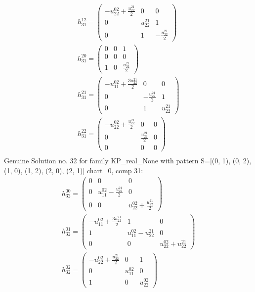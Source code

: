 \documentclass[a4paper, 11pt, twoside, onecolumn]{article}
\begin{document}
\begin{landscape}
\begin{gather*}
	 h_{31}^{12}=\begin{pmatrix}- u^{02}_{22} + \frac{u^{21}_{22}}{2} & 0 & 0\\0 & u^{21}_{22} & 1\\0 & 1 & - \frac{u^{21}_{22}}{2}\end{pmatrix}\\ 
	 h_{31}^{20}=\begin{pmatrix}0 & 0 & 1\\0 & 0 & 0\\1 & 0 & \frac{u^{21}_{22}}{2}\end{pmatrix}\\ 
	 h_{31}^{21}=\begin{pmatrix}- u^{02}_{11} + \frac{3 u^{21}_{22}}{2} & 0 & 0\\0 & - \frac{u^{21}_{22}}{2} & 1\\0 & 1 & u^{21}_{22}\end{pmatrix}\\ 
	 h_{31}^{22}=\begin{pmatrix}- u^{02}_{22} + \frac{u^{21}_{22}}{2} & 0 & 0\\0 & \frac{u^{21}_{22}}{2} & 0\\0 & 0 & 0\end{pmatrix}\\ 
\end{gather*} 
Genuine Solution no. 32 for family KP_real_None with pattern S=[(0, 1), (0, 2), (1, 0), (1, 2), (2, 0), (2, 1)] chart=0, comp 31: 
\begin{gather*} 
	 h_{32}^{00}=\begin{pmatrix}0 & 0 & 0\\0 & u^{02}_{11} - \frac{u^{21}_{22}}{2} & 0\\0 & 0 & u^{02}_{22} + \frac{u^{21}_{22}}{2}\end{pmatrix}\\ 
	 h_{32}^{01}=\begin{pmatrix}- u^{02}_{11} + \frac{3 u^{21}_{22}}{2} & 1 & 0\\1 & u^{02}_{11} - u^{21}_{22} & 0\\0 & 0 & u^{02}_{22} + u^{21}_{22}\end{pmatrix}\\ 
	 h_{32}^{02}=\begin{pmatrix}- u^{02}_{22} + \frac{u^{21}_{22}}{2} & 0 & 1\\0 & u^{02}_{11} & 0\\1 & 0 & u^{02}_{22}\end{pmatrix}\\ 

\end{gather*}
\end{landscape}
\end{document}
